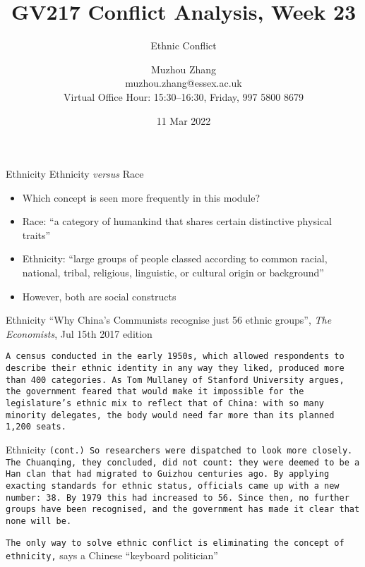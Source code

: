 \documentclass{beamer}
\title{GV217 Conflict Analysis, Week 23}
\subtitle{Ethnic Conflict}
\author{Muzhou Zhang\\ muzhou.zhang@essex.ac.uk\\ Virtual Office Hour: 15:30--16:30, Friday, 997 5800 8679}
\date{11 Mar 2022}
\begin{document}
\maketitle
{}

\begin{frame}{Ethnicity}
    \pause Ethnicity \textit{versus} Race
    \begin{itemize}
        \pause\item Which concept is seen more frequently in this module?
        \pause\item Race: ``a category of humankind that shares certain distinctive physical traits''
        \pause\item Ethnicity: ``large groups of people classed according to common racial, national, tribal, religious, linguistic, or cultural origin or background''
        \pause\item However, both are social constructs
    \end{itemize}
\end{frame}

\begin{frame}{Ethnicity}
    \pause ``Why China's Communists recognise just 56 ethnic groups'', \textit{The Economists}, Jul 15th 2017 edition
    \vspace{30pt}

    \pause\texttt{\scriptsize A census conducted in the early 1950s, which allowed respondents to describe their ethnic identity in any way they liked, produced more than 400 categories. As Tom Mullaney of Stanford University argues, the government feared that would make it impossible for the legislature's ethnic mix to reflect that of China: with so many minority delegates, the body would need far more than its planned 1,200 seats.}
\end{frame}

\begin{frame}{Ethnicity}
    \pause\texttt{\scriptsize (cont.) So researchers were dispatched to look more closely. The Chuanqing, they concluded, did not count: they were deemed to be a Han clan that had migrated to Guizhou centuries ago. By applying exacting standards for ethnic status, officials came up with a new number: 38. By 1979 this had increased to 56. Since then, no further groups have been recognised, and the government has made it clear that none will be.}
    \vspace{15pt}

    \pause\texttt{The only way to solve ethnic conflict is eliminating the concept of ethnicity,} says a Chinese ``keyboard politician''
\end{frame}
\end{document}
